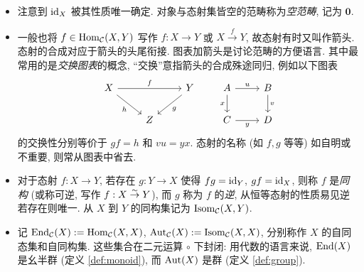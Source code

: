 \begin{itemize}
	\item 注意到 $\mathrm{id}_X$ 被其性质唯一确定. 对象与态射集皆空的范畴称为\emph{空范畴}, 记为 $\mathbf{0}$.
	\item 一般也将 $f \in \operatorname{Hom}_{\mathcal{C}}(X, Y)$ 写作 $f: X \to Y$ 或 $X \xrightarrow{f} Y$, 故态射有时又叫作箭头. 态射的合成对应于箭头的头尾衔接. 图表加箭头是讨论范畴的方便语言. 其中最常用的是\emph{交换图表}的概念, ``交换''意指箭头的合成殊途同归, 例如以下图表
	\[ \begin{tikzcd}
		X \arrow[rr, "f"] \arrow[rd, "h"'] & & Y \arrow[ld, "g"] \\
		& Z &
	\end{tikzcd} \qquad \begin{tikzcd}
		A \arrow[r, "u"] \arrow[d, "x"'] & B \arrow[d, "v"] \\
		C \arrow[r, "y"'] & D
	\end{tikzcd} \]
	的交换性分别等价于 $g f = h$ 和 $v u = y x$. 态射的名称 (如 $f,g$ 等等) 如自明或不重要, 则常从图表中省去.

	\item 对于态射 $f: X \to Y$, 若存在 $g: Y \to X$ 使得 $f g = \mathrm{id}_Y$, $g f = \mathrm{id}_X$, 则称 $f$ 是\emph{同构} (或称可逆, 写作 $f: X \stackrel{\sim}{\rightarrow} Y$), 而 $g$ 称为 $f$ 的\emph{逆}, 从恒等态射的性质易见逆若存在则唯一. 从 $X$ 到 $Y$ 的同构集记为 $\operatorname{Isom}_{\mathcal{C}}(X, Y)$. 

	\item 记 $\operatorname{End}_{\mathcal{C}}(X) := \operatorname{Hom}_{\mathcal{C}}(X, X)$, $\operatorname{Aut}_{\mathcal{C}}(X) := \operatorname{Isom}_{\mathcal{C}}(X, X)$, 分别称作 $X$ 的自同态集和自同构集. 这些集合在二元运算 $\circ$ 下封闭: 用代数的语言来说, $\operatorname{End}(X)$ 是幺半群 (定义 \ref{def:monoid}), 而 $\operatorname{Aut}(X)$ 是群 (定义 \ref{def:group}).
\end{itemize}

